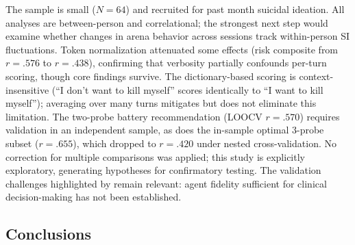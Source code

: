 \documentclass[review,12pt,authoryear]{elsarticle}
\begin{document}
The sample is small ($N = 64$) and recruited for past month suicidal ideation. All analyses are between-person and correlational; the strongest next step would examine whether changes in arena behavior across sessions track within-person SI fluctuations. Token normalization attenuated some effects (risk composite from $r = .576$ to $r = .438$), confirming that verbosity partially confounds per-turn scoring, though core findings survive. The dictionary-based scoring is context-insensitive (``I don't want to kill myself'' scores identically to ``I want to kill myself''); averaging over many turns mitigates but does not eliminate this limitation. The two-probe battery recommendation (LOOCV $r = .570$) requires validation in an independent sample, as does the in-sample optimal 3-probe subset ($r = .655$), which dropped to $r = .420$ under nested cross-validation. No correction for multiple comparisons was applied; this study is explicitly exploratory, generating hypotheses for confirmatory testing. The validation challenges highlighted by \citet{tornberg2025validation} remain relevant: agent fidelity sufficient for clinical decision-making has not been established. %



\subsection{Conclusions}

\end{document}
